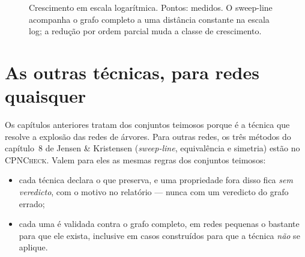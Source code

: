 \documentclass[11pt,a4paper]{report}
\newcommand{\cpn}{\textsc{CPNCheck}}
\theoremstyle{definition}
\begin{document}
\begin{figure}[H]
\centering
{}
\caption{Crescimento em escala logarítmica. Pontos: medidos. O sweep-line
acompanha o grafo completo a uma distância constante na escala log; a redução
por ordem parcial muda a classe de crescimento.}
\label{fig:crescimento}
\end{figure}

\chapter{As outras técnicas, para redes quaisquer}
\label{cap:outras}

Os capítulos anteriores tratam dos conjuntos teimosos porque é a técnica que
resolve a explosão das redes de árvores. Para outras redes, os três métodos do
capítulo~8 de Jensen \& Kristensen (\emph{sweep-line}, equivalência e
simetria) estão no \cpn{}. Valem para eles as mesmas regras dos conjuntos
teimosos:

\begin{itemize}[leftmargin=1.4em]
  \item cada técnica declara o que preserva, e uma propriedade fora disso fica
        \emph{sem veredicto}, com o motivo no relatório --- nunca com um
        veredicto do grafo errado;
  \item cada uma é validada contra o grafo completo, em redes pequenas o
        bastante para que ele exista, inclusive em casos construídos para que
        a técnica \emph{não} se aplique.
\end{itemize}
\end{document}
